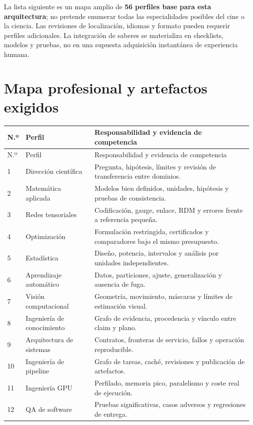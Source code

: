 La lista siguiente es un mapa amplio de \textbf{56 perfiles base para esta arquitectura}; no pretende enumerar todas las especialidades posibles del cine o la ciencia. Las revisiones de localización, idiomas y formato pueden requerir perfiles adicionales. La integración de saberes se materializa en checklists, modelos y pruebas, no en una supuesta adquisición instantánea de experiencia humana.

\clearpage
\section{Mapa profesional y artefactos exigidos}
{\compacttable
\begin{longtable}{p{.05\linewidth}p{.25\linewidth}p{.56\linewidth}}
\toprule N.º & Perfil & Responsabilidad y evidencia de competencia \\\midrule\endfirsthead
\toprule N.º & Perfil & Responsabilidad y evidencia de competencia \\\midrule\endhead
1 & Dirección científica & Pregunta, hipótesis, límites y revisión de transferencia entre dominios.\\
2 & Matemática aplicada & Modelos bien definidos, unidades, hipótesis y pruebas de consistencia.\\
3 & Redes tensoriales & Codificación, gauge, enlace, RDM y errores frente a referencia pequeña.\\
4 & Optimización & Formulación restringida, certificados y comparadores bajo el mismo presupuesto.\\
5 & Estadística & Diseño, potencia, intervalos y análisis por unidades independientes.\\
6 & Aprendizaje automático & Datos, particiones, ajuste, generalización y ausencia de fuga.\\
7 & Visión computacional & Geometría, movimiento, máscaras y límites de estimación visual.\\
8 & Ingeniería de conocimiento & Grafo de evidencia, procedencia y vínculo entre claim y plano.\\
9 & Arquitectura de sistemas & Contratos, fronteras de servicio, fallos y operación reproducible.\\
10 & Ingeniería de pipeline & Grafo de tareas, caché, revisiones y publicación de artefactos.\\
11 & Ingeniería GPU & Perfilado, memoria pico, paralelismo y coste real de ejecución.\\
12 & QA de software & Pruebas significativas, casos adversos y regresiones de entrega.\\

\end{longtable}}
